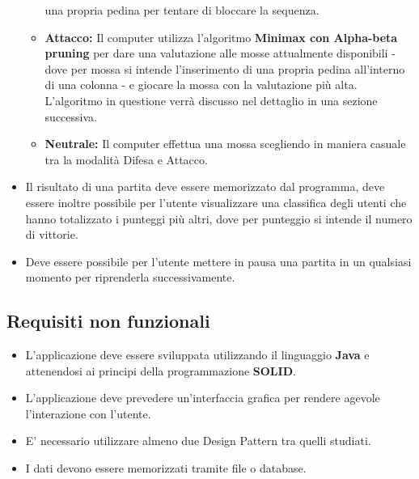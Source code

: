 \begin{itemize}
\begin{itemize}
            una propria pedina per tentare di bloccare la sequenza.
            \item \textbf{Attacco:} Il computer utilizza l'algoritmo \textbf{Minimax con Alpha-beta pruning}\cite{Wiki} per dare
            una valutazione alle mosse attualmente disponibili - dove per mossa si intende l'inserimento di una propria
            pedina all'interno di una colonna - e giocare la mossa con la valutazione più alta. \\
            L'algoritmo in questione verrà discusso nel dettaglio in una sezione successiva.
            \item \textbf{Neutrale:} Il computer effettua una mossa scegliendo in maniera casuale tra la modalità Difesa
            e Attacco.
        \end{itemize}
    \item Il risultato di una partita deve essere memorizzato dal programma, deve essere inoltre possibile per l'utente
    visualizzare una classifica degli utenti che hanno totalizzato i punteggi più altri, dove per punteggio si intende
    il numero di vittorie.
    \item Deve essere possibile per l'utente mettere in pausa una partita in un qualsiasi momento per riprenderla
    successivamente.
\end{itemize}

\subsection{Requisiti non funzionali}\label{subsec:requisiti-non-funzionali}
\begin{itemize}
    \item L'applicazione deve essere sviluppata utilizzando il linguaggio \textbf{Java} e attenendosi ai principi
    della programmazione \textbf{SOLID}.
    \item L'applicazione deve prevedere un'interfaccia grafica per rendere agevole l'interazione con l'utente.
    \item E' necessario utilizzare almeno due Design Pattern tra quelli studiati.
    \item I dati devono essere memorizzati tramite file o database.
\end{itemize}